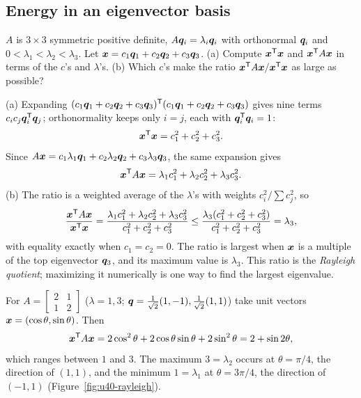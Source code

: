 \subsection{Energy in an eigenvector basis}

\begin{exercise}[Question 5]\label{exr:u40-q5}
$A$ is $3\times3$ symmetric positive definite, $A\boldsymbol{q}_i=\lambda_i\boldsymbol{q}_i$ with orthonormal $\boldsymbol{q}_i$ and $0<\lambda_1<\lambda_2<\lambda_3$. Let $\boldsymbol{x}=c_1\boldsymbol{q}_1+c_2\boldsymbol{q}_2+c_3\boldsymbol{q}_3$.
(a) Compute $\boldsymbol{x}^{\mathsf{T}}\boldsymbol{x}$ and $\boldsymbol{x}^{\mathsf{T}} A\boldsymbol{x}$ in terms of the $c$'s and $\lambda$'s.
(b) Which $c$'s make the ratio $\boldsymbol{x}^{\mathsf{T}} A\boldsymbol{x}/\boldsymbol{x}^{\mathsf{T}}\boldsymbol{x}$ as large as possible?
\end{exercise}
\begin{solution}
(a) Expanding $(c_1\boldsymbol{q}_1+c_2\boldsymbol{q}_2+c_3\boldsymbol{q}_3)^{\mathsf{T}}(c_1\boldsymbol{q}_1+c_2\boldsymbol{q}_2+c_3\boldsymbol{q}_3)$ gives nine terms $c_ic_j\boldsymbol{q}_i^{\mathsf{T}}\boldsymbol{q}_j$; orthonormality keeps only $i=j$, each with $\boldsymbol{q}_i^{\mathsf{T}}\boldsymbol{q}_i=1$:
\[
\boldsymbol{x}^{\mathsf{T}}\boldsymbol{x}=c_1^{2}+c_2^{2}+c_3^{2}.
\]
Since $A\boldsymbol{x}=c_1\lambda_1\boldsymbol{q}_1+c_2\lambda_2\boldsymbol{q}_2+c_3\lambda_3\boldsymbol{q}_3$, the same expansion gives
\[
\boldsymbol{x}^{\mathsf{T}} A\boldsymbol{x}=\lambda_1c_1^{2}+\lambda_2c_2^{2}+\lambda_3c_3^{2}.
\]
(b) The ratio is a weighted average of the $\lambda$'s with weights $c_i^{2}/\sum c_j^{2}$, so
\[
\frac{\boldsymbol{x}^{\mathsf{T}} A\boldsymbol{x}}{\boldsymbol{x}^{\mathsf{T}}\boldsymbol{x}}=\frac{\lambda_1c_1^{2}+\lambda_2c_2^{2}+\lambda_3c_3^{2}}{c_1^{2}+c_2^{2}+c_3^{2}}\le\frac{\lambda_3(c_1^{2}+c_2^{2}+c_3^{2})}{c_1^{2}+c_2^{2}+c_3^{2}}=\lambda_3,
\]
with equality exactly when $c_1=c_2=0$. The ratio is largest when $\boldsymbol{x}$ is a multiple of the top eigenvector $\boldsymbol{q}_3$, and its maximum value is $\lambda_3$. This ratio is the \emph{Rayleigh quotient}; maximizing it numerically is one way to find the largest eigenvalue.
\end{solution}

\begin{example}\label{ex:u40-rayleigh}
For $A=\begin{bmatrix}2&1\\1&2\end{bmatrix}$ ($\lambda=1,3$; $\boldsymbol{q}=\tfrac{1}{\sqrt2}(1,-1),\tfrac{1}{\sqrt2}(1,1)$) take unit vectors $\boldsymbol{x}=(\cos\theta,\sin\theta)$. Then
\[
\boldsymbol{x}^{\mathsf{T}} A\boldsymbol{x}=2\cos^{2}\theta+2\cos\theta\sin\theta+2\sin^{2}\theta=2+\sin2\theta,
\]
which ranges between $1$ and $3$. The maximum $3=\lambda_2$ occurs at $\theta=\pi/4$, the direction of $(1,1)$, and the minimum $1=\lambda_1$ at $\theta=3\pi/4$, the direction of $(-1,1)$ (Figure~\ref{fig:u40-rayleigh}).
\end{example}


